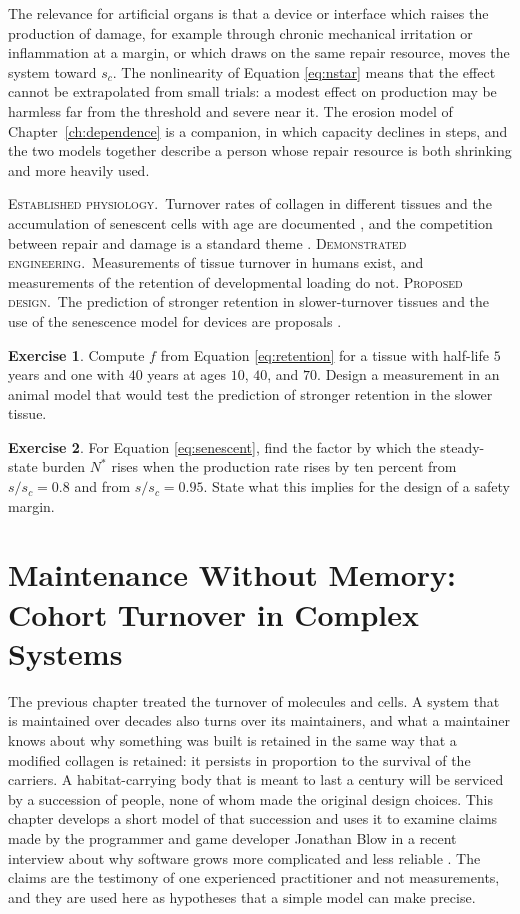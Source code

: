 \documentclass[11pt,openany]{book}
\theoremstyle{definition}
\newtheorem{exercise}{Exercise}[chapter]
\theoremstyle{remark}
\newcommand{\est}{\textsc{Established physiology.}\ }
\newcommand{\dem}{\textsc{Demonstrated engineering.}\ }
\newcommand{\pro}{\textsc{Proposed design.}\ }
\begin{document}
The relevance for artificial organs is that a device or interface which raises the production of damage, for example through chronic mechanical irritation or inflammation at a margin, or which draws on the same repair resource, moves the system toward $s_c$. The nonlinearity of Equation \eqref{eq:nstar} means that the effect cannot be extrapolated from small trials: a modest effect on production may be harmless far from the threshold and severe near it. The erosion model of Chapter~\ref{ch:dependence} is a companion, in which capacity declines in steps, and the two models together describe a person whose repair resource is both shrinking and more heavily used.

\begin{evidence}
\est Turnover rates of collagen in different tissues and the accumulation of senescent cells with age are documented \cite{verzijl2000,campisi2007}, and the competition between repair and damage is a standard theme \cite{kirkwood1977}. \dem Measurements of tissue turnover in humans exist, and measurements of the retention of developmental loading do not. \pro The prediction of stronger retention in slower-turnover tissues and the use of the senescence model for devices are proposals \cite{flyxion2026mi,flyxion2026recursive}.
\end{evidence}

\begin{exercise}
Compute $f$ from Equation \eqref{eq:retention} for a tissue with half-life $5$ years and one with $40$ years at ages $10$, $40$, and $70$. Design a measurement in an animal model that would test the prediction of stronger retention in the slower tissue.
\end{exercise}

\begin{exercise}
For Equation \eqref{eq:senescent}, find the factor by which the steady-state burden $N^{*}$ rises when the production rate rises by ten percent from $s/s_c=0.8$ and from $s/s_c=0.95$. State what this implies for the design of a safety margin.
\end{exercise}

\chapter{Maintenance Without Memory: Cohort Turnover in Complex Systems}
\label{ch:cohorts}

The previous chapter treated the turnover of molecules and cells. A system that is maintained over decades also turns over its maintainers, and what a maintainer knows about why something was built is retained in the same way that a modified collagen is retained: it persists in proportion to the survival of the carriers. A habitat-carrying body that is meant to last a century will be serviced by a succession of people, none of whom made the original design choices. This chapter develops a short model of that succession and uses it to examine claims made by the programmer and game developer Jonathan Blow in a recent interview about why software grows more complicated and less reliable \cite{blow2026}. The claims are the testimony of one experienced practitioner and not measurements, and they are used here as hypotheses that a simple model can make precise.
\end{document}
